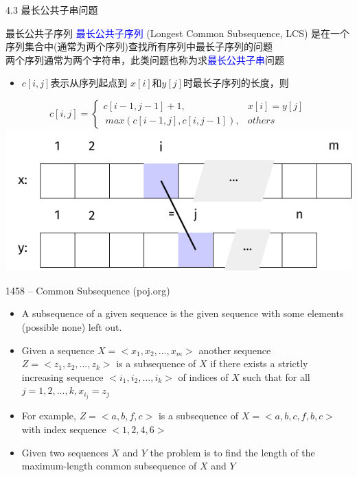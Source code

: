\begin{frame}{4.3 最长公共子串问题}
    \begin{block}{最长公共子序列}
        \textcolor{blue}{最长公共子序列} (Longest Common Subsequence, LCS) 是在一个序列集合中(通常为两个序列)查找所有序列中最长子序列的问题\\
        两个序列通常为两个字符串，此类问题也称为求\textcolor{blue}{最长公共子串}问题
    \end{block}
    \begin{itemize}
        \item $c[i,j]$表示从序列起点到 $x[i]$和$y[j]$时最长子序列的长度，则
    \end{itemize}
    $$c[i,j]=\begin{cases} c[i-1,j-1]+1, &x[i]=y[j] \\\ max(c[i-1,j],c[i,j-1]), &others \end{cases}$$
    \includegraphics[scale=.7,center]{fig/4-5.pdf}
\end{frame}
\begin{frame}{1458 -- Common Subsequence (poj.org)}
    \begin{itemize}
        \item A subsequence of a given sequence is the given sequence with some elements (possible none) left out.
        \item Given a sequence $X=<x_1, x_2, ..., x_m>$ another sequence $Z=< z_1, z_2, ..., z_k>$ is a subsequence of $X$ if there exists a strictly increasing sequence $<i_1, i_2, ..., i_k>$ of indices of $X$ such that for all $j=1,2,...,k, x_{i_j}=z_j$
        \item For example, $Z=<a, b, f, c>$ is a subsequence of $X=<a, b, c, f, b, c>$ with	index sequence $<1, 2, 4, 6>$
        \item Given two sequences $X$ and $Y$ the problem is to find the length of the maximum-length common subsequence of $X$ and $Y$
    \end{itemize}
\end{frame}
